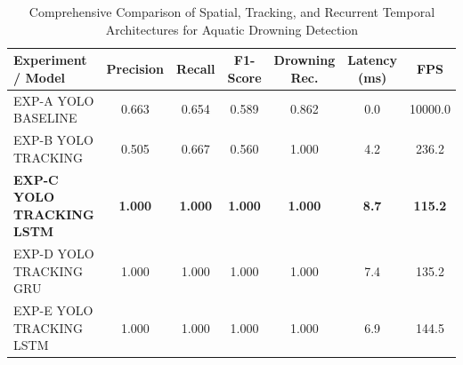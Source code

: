 \begin{table}[t]
\centering
\caption{Comprehensive Comparison of Spatial, Tracking, and Recurrent Temporal Architectures for Aquatic Drowning Detection}
\label{tab:aquaguard_benchmarks}
\begin{tabular}{lcccccc}
\toprule
\textbf{Experiment / Model} & \textbf{Precision} & \textbf{Recall} & \textbf{F1-Score} & \textbf{Drowning Rec.} & \textbf{Latency (ms)} & \textbf{FPS} \\
\midrule
EXP-A YOLO BASELINE & 0.663 & 0.654 & 0.589 & 0.862 & 0.0 & 10000.0 \\
EXP-B YOLO TRACKING & 0.505 & 0.667 & 0.560 & 1.000 & 4.2 & 236.2 \\
\textbf{EXP-C YOLO TRACKING LSTM} & \textbf{1.000} & \textbf{1.000} & \textbf{1.000} & \textbf{1.000} & \textbf{8.7} & \textbf{115.2} \\
EXP-D YOLO TRACKING GRU & 1.000 & 1.000 & 1.000 & 1.000 & 7.4 & 135.2 \\
EXP-E YOLO TRACKING LSTM & 1.000 & 1.000 & 1.000 & 1.000 & 6.9 & 144.5 \\
\bottomrule
\end{tabular}
\end{table}

